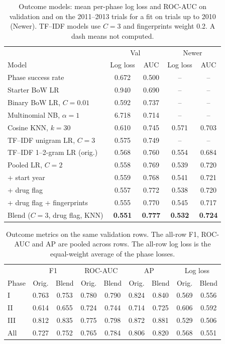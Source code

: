 \documentclass[10pt,twocolumn,letterpaper]{article}
\begin{document}
\begin{table}[!t]
\centering
\footnotesize
\setlength{\tabcolsep}{3pt}
\begin{tabular}{lcccc}
\toprule
 & \multicolumn{2}{c}{Val} & \multicolumn{2}{c}{Newer} \\
Model & Log loss & AUC & Log loss & AUC \\
\midrule
Phase success rate & 0.672 & 0.500 & -- & -- \\
Starter BoW LR & 0.940 & 0.690 & -- & -- \\
Binary BoW LR, $C=0.01$ & 0.592 & 0.737 & -- & -- \\
Multinomial NB, $\alpha=1$ & 6.718 & 0.714 & -- & -- \\
Cosine KNN, $k=30$ & 0.610 & 0.745 & 0.571 & 0.703 \\
TF--IDF unigram LR, $C=3$ & 0.575 & 0.749 & -- & -- \\
TF--IDF 1--2-gram LR (orig.) & 0.568 & 0.760 & 0.554 & 0.684 \\
Pooled LR, $C=2$ & 0.558 & 0.769 & 0.539 & 0.720 \\
\quad + start year & 0.559 & 0.768 & 0.541 & 0.721 \\
\quad + drug flag & 0.557 & 0.772 & 0.538 & 0.720 \\
\quad + drug flag + fingerprints & 0.555 & 0.770 & 0.545 & 0.717 \\
Blend ($C=3$, drug flag, KNN) & \textbf{0.551} & \textbf{0.777} & \textbf{0.532} & \textbf{0.724} \\
\bottomrule
\end{tabular}
\caption{Outcome models: mean per-phase log loss and ROC-AUC on validation and on the 2011--2013 trials for a fit on trials up to 2010 (Newer). TF--IDF models use $C=3$ and fingerprints weight 0.2. A dash means not computed.}
\label{tab:outcome-models}
\end{table}

\begin{table}[!t]
\centering
\footnotesize
\setlength{\tabcolsep}{2.25pt}
\begin{tabular}{lcccccccc}
\toprule
 & \multicolumn{2}{c}{F1} & \multicolumn{2}{c}{ROC-AUC} &
 \multicolumn{2}{c}{AP} & \multicolumn{2}{c}{Log loss} \\
Phase & Orig. & Blend & Orig. & Blend & Orig. & Blend & Orig. & Blend \\
\midrule
I & 0.763 & 0.753 & 0.780 & 0.790 & 0.824 & 0.840 & 0.569 & 0.556 \\
II & 0.614 & 0.655 & 0.724 & 0.744 & 0.714 & 0.725 & 0.606 & 0.592 \\
III & 0.812 & 0.835 & 0.775 & 0.798 & 0.872 & 0.881 & 0.529 & 0.506 \\
All & 0.727 & 0.752 & 0.765 & 0.784 & 0.806 & 0.820 & 0.568 & 0.551 \\
\bottomrule
\end{tabular}
\caption{Outcome metrics on the same validation rows. The all-row F1, ROC-AUC and AP are pooled across rows. The all-row log loss is the equal-weight average of the phase losses.}
\label{tab:outcomes}
\end{table}
\end{document}
